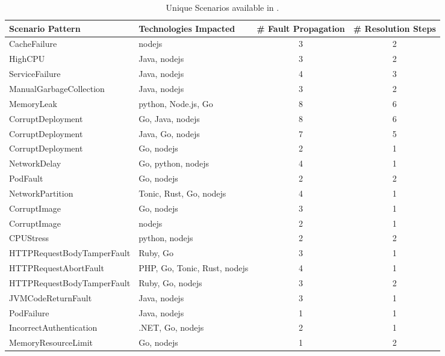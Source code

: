 \begin{table*}[htbp!]
\centering
    \centering
    \begin{threeparttable}
        \caption{Unique Scenarios available in \bench.}
        \label{tab:bench_sre_task_scenarios}
        \begin{tabular}{llcc}
            \toprule
             \textbf{Scenario Pattern} & \textbf{Technologies Impacted} & \textbf{\# Fault Propagation} & \textbf{\# Resolution Steps} \\
            \midrule
             CacheFailure               & nodejs                & 3 & 2 \\
             HighCPU &  Java, nodejs & 3 & 2 \\
             ServiceFailure & Java, nodejs & 4 & 3 \\
             ManualGarbageCollection & Java, nodejs & 3 & 2 \\
             MemoryLeak & python, Node.js, Go & 8 & 6 \\
             CorruptDeployment & Go, Java, nodejs & 8 & 6 \\
             CorruptDeployment & Java, Go, nodejs & 7 & 5 \\
             CorruptDeployment & Go, nodejs & 2 & 1 \\
             NetworkDelay &  Go, python, nodejs & 4 & 1 \\
             PodFault &  Go, nodejs & 2 & 2 \\
             NetworkPartition &  Tonic, Rust, Go, nodejs & 4 & 1 \\
             CorruptImage & Go, nodejs & 3 & 1 \\
             CorruptImage &  nodejs & 2 & 1 \\
             CPUStress &  python, nodejs & 2 & 2 \\
             HTTPRequestBodyTamperFault &  Ruby, Go & 3 & 1 \\
             HTTPRequestAbortFault &  PHP, Go, Tonic, Rust, nodejs & 4 & 1 \\
             HTTPRequestBodyTamperFault &  Ruby, Go, nodejs & 3 & 2 \\
             JVMCodeReturnFault &  Java, nodejs & 3 & 1 \\
             PodFailure &  Java, nodejs & 1 & 1 \\
             IncorrectAuthentication & .NET, Go, nodejs & 2 & 1 \\
             MemoryResourceLimit & Go,  nodejs & 1 & 2 \\
            \bottomrule
        \end{tabular}
    \end{threeparttable}
\end{table*}



